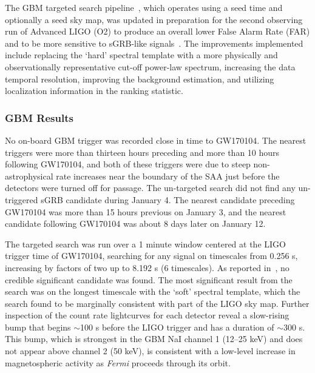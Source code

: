 \documentclass{aastex61}
\begin{document}
The GBM targeted search pipeline~\citep{Blackburn15}, which operates using a seed time and optionally a seed sky map, was updated in preparation for the second observing run of Advanced LIGO (O2) to produce an overall lower False Alarm Rate (FAR) and to be more sensitive to sGRB-like signals~\citep{Goldstein16}.  The improvements implemented include replacing the `hard' spectral template with a more physically and observationally representative cut-off power-law spectrum, increasing the data temporal resolution, improving the background 
estimation, and utilizing localization information in the ranking statistic.

\subsubsection{GBM Results}
No on-board GBM trigger was recorded close in time to GW170104.  The nearest triggers were more than thirteen hours preceding and more than 10 hours following GW170104, and both of these triggers were due to steep non-astrophysical rate increases near the boundary of the SAA just before the detectors were turned off for passage. The un-targeted search did not find any un-triggered sGRB candidate during January 4.  The nearest candidate preceding GW170104 was more than 15 hours previous on January 3, and the nearest candidate following GW170104 was about 8 days later on January 12.

The targeted search was run over a 1 minute window centered at the LIGO trigger time of GW170104, searching for any signal on timescales from 0.256 s, increasing by factors of two up to 8.192 s (6 timescales).  As reported in~\citet{Burns17}, no credible significant candidate was found.  The most significant result from the search was on the longest timescale with the `soft' spectral template, which the search found to be marginally consistent with part of the LIGO sky map.  Further inspection of the count rate lightcurves for each detector reveal a slow-rising bump that begins $\sim$100 s before the LIGO trigger and has a duration of $\sim$300 s.  This bump, which is strongest in the GBM NaI channel 1 (12--25 keV) and does not appear above channel 2 (50 keV), is consistent with a low-level increase in magnetospheric activity as {\it Fermi} proceeds through its orbit. 
\end{document}
